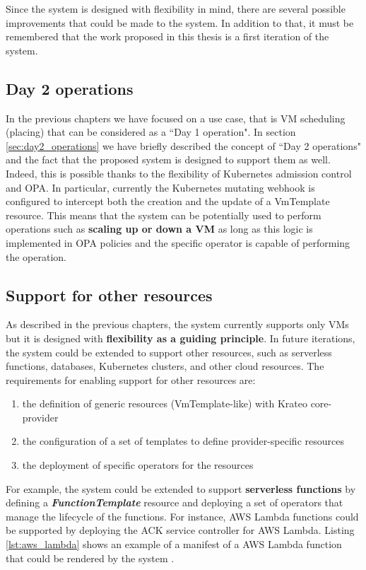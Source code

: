 Since the system is designed with flexibility in mind, there are several possible improvements that could be made to the system.
In addition to that, it must be remembered that the work proposed in this thesis is a first iteration of the system.

\subsection{Day 2 operations}

In the previous chapters we have focused on a use case, that is VM scheduling (placing) that can be considered as a ``Day 1 operation".
In section \ref{sec:day2_operations} we have briefly described the concept of ``Day 2 operations" and the fact that the proposed system is designed to support them as well.
Indeed, this is possible thanks to the flexibility of Kubernetes admission control and OPA.
In particular, currently the Kubernetes mutating webhook is configured to intercept both the creation and the update of a VmTemplate resource.
This means that the system can be potentially used to perform operations such as \textbf{scaling up or down a VM} as long as this logic is implemented in OPA policies and the specific operator is capable of performing the operation.

\subsection{Support for other resources}
\label{sec:support_other_resources}

As described in the previous chapters, the system currently supports only VMs but it is designed with \textbf{flexibility as a guiding principle}.
In future iterations, the system could be extended to support other resources, such as serverless functions, databases, Kubernetes clusters, and other cloud resources.
The requirements for enabling support for other resources are: 
\begin{enumerate}
    \item the definition of generic resources (VmTemplate-like) with Krateo core-provider
    \item the configuration of a set of templates to define provider-specific resources
    \item the deployment of specific operators for the resources
\end{enumerate}

For example, the system could be extended to support \textbf{serverless functions} by defining a \textbf{\textit{FunctionTemplate}} resource and deploying a set of operators that manage the lifecycle of the functions.
For instance, AWS Lambda functions could be supported by deploying the ACK service controller for AWS Lambda.
Listing \ref{lst:aws_lambda} shows an example of a manifest of a AWS Lambda function that could be rendered by the system \cite{aws_lambda_ack}. \newline

